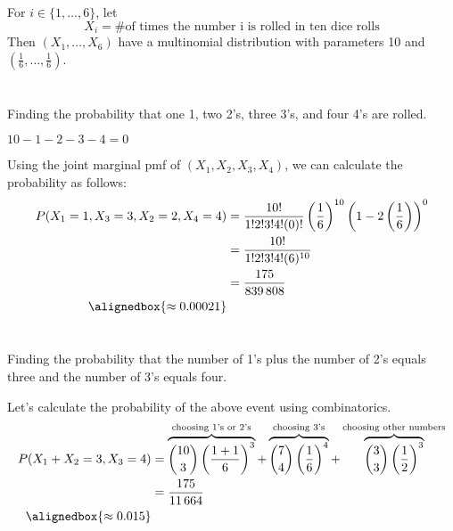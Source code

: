 \documentclass[hwnumber=4,studentnumber=20053722]{mthe353answer}
\begin{document}
  \begin{questions}
    \setcounter{question}{0}
    \question{}
    For \(i \in \{1, \dots, 6\}\), let
    \begin{equation*}
      X_i = \text{\# of times the number i is rolled in ten dice rolls}
    \end{equation*}
    Then \((X_1, \dots, X_6)\) have a multinomial distribution with parameters
    10 and \((\frac{1}{6}, \dots, \frac{1}{6})\).
    \begin{parts}
      \part{}
      Finding the probability that one 1, two 2's, three 3's, and four 4's are rolled.
      \begin{solution}
        \begin{note}
          \(10-1-2-3-4=0\)
        \end{note}
        Using the joint marginal pmf of \((X_1, X_2, X_3, X_4)\), we can
        calculate the probability as follows:
        \begin{align*}
          P(X_1=1, X_3=3, X_2=2, X_4=4) &= \frac{10!}{1!2!3!4!(0)!}
           \left(\frac{1}{6}\right)^{10}\left(1-2\left(\frac{1}{6}\right)\right)^0\\
          &= \frac{10!}{1!2!3!4!(6)^{10}}\\
          &= \frac{175}{839\,808}\\
          \alignedbox{\approx 0.00021}
        \end{align*}
      \end{solution}
      \part{}
      Finding the probability that the number of 1's plus the number of 2's
      equals three and the number of 3's equals four.
      \begin{solution}
        Let's calculate the probability of the above event using combinatorics.
        \begin{align*}
          P(X_1+X_2=3, X_3=4) &=
            \overbrace{\binom{10}{3}\left(\frac{1+1}{6}\right)^3}^{\text{choosing 1's or 2's}}
            + \overbrace{\binom{7}{4}\left(\frac{1}{6}\right)^4}^{\text{choosing 3's}}
            + \overbrace{\binom{3}{3}\left(\frac{1}{2}\right)^3}^{\text{choosing other numbers}}\\
          &= \frac{175}{11\,664}\\
          \alignedbox{\approx 0.015}
        \end{align*}
      \end{solution}
      \newpage

\end{parts}
\end{questions}
\end{document}
